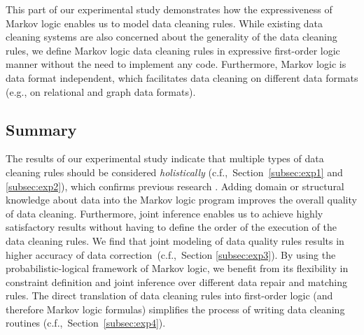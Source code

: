 This part of our experimental study demonstrates how the expressiveness of Markov logic enables us to model data cleaning rules. While existing data cleaning systems \cite{Dallachiesa:2013:NCD:2463676.2465327} are also concerned about the generality of the data cleaning rules, we define Markov logic data cleaning rules in expressive first-order logic manner without the need to implement any code. Furthermore, Markov logic is data format independent, which facilitates data cleaning on different data formats (e.g., on relational and graph data formats). 

\subsection{Summary}

The results of our experimental study indicate that multiple types of data cleaning rules should be considered \textit{holistically} (c.f.,~Section~\ref{subsec:exp1} and \ref{subsec:exp2}), which confirms previous research \cite{Dallachiesa:2013:NCD:2463676.2465327, Fan:2014:IRM:2628135.2567657, Fan:2011:IRM:1989323.1989373}. Adding domain or structural knowledge about data into the Markov logic program improves the overall quality of data cleaning. Furthermore, joint inference enables us to achieve highly satisfactory results without having to define the order of the execution of the data cleaning rules. We find that joint modeling of data quality rules results in higher accuracy of data correction~(c.f.,~Section \ref{subsec:exp3}). By using the probabilistic-logical framework of Markov logic, we benefit from its flexibility in constraint definition and joint inference over different data repair and matching rules. The direct translation of data cleaning rules into first-order logic (and therefore Markov logic formulas) simplifies the process of writing data cleaning routines (c.f.,~Section~\ref{subsec:exp4}). 
